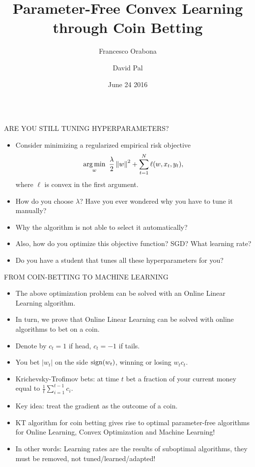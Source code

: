 \documentclass[final,t,serif,mathserif]{beamer}
\title{\huge Parameter-Free Convex Learning through Coin Betting}
\author{Francesco Orabona \and David Pal}
\institute[] %
{
  Yahoo Research, New York
}
\date[June 24 2016]{June 24 2016}
\def\spazio{\vspace{-0.325cm}}
\begin{document}
\begin{frame}{} 

\begin{columns}[t]
  \begin{column}{.33\linewidth}

    \begin{block}{ARE YOU STILL TUNING HYPERPARAMETERS?}
      \spazio
      \centering
      \begin{itemize}
      \item Consider minimizing a regularized empirical risk objective
      \begin{equation}
      \label{equation:objective-function}
         \operatorname*{arg\,min}_{w} \ \frac{\lambda}{2} \left\|{w}\right\|^2 + \sum_{t=1}^N \ell(w, x_t, y_t),
      \end{equation}
      where $\ell$ is convex in the first argument.
      \item How do you choose $\lambda$? Have you ever wondered why you have to tune it manually?
      \item Why the algorithm is not able to select it automatically?
      \item Also, how do you optimize this objective function? SGD? What learning rate?
      \item Do you have a student that tunes all these hyperparameters for you?
      \end{itemize}
      \spazio
    \end{block}
    

    \begin{block}{FROM COIN-BETTING TO MACHINE LEARNING}
    \spazio
    \begin{itemize}
      \item The above optimization problem can be solved with an Online Linear Learning algorithm.
      \item In turn, we prove that Online Linear Learning can be solved with online algorithms to bet on a coin.
      \item Denote by $c_t=1$ if head, $c_t=-1$ if tails.
      \item You bet $|w_t|$ on the side ${\rm sign}(w_t)$, winning or losing $ w_t c_t$.
      \item Krichevsky-Trofimov bets: at time $t$ bet a fraction of your current money equal to $\tfrac{1}{t} \sum_{i=1}^{t-1} c_i$.
      \item Key idea: treat the gradient as the outcome of a coin.
      \item \alert{KT algorithm for coin betting gives rise to optimal parameter-free algorithms for Online Learning, Convex Optimization and Machine Learning!}
      \item In other words: \alert{Learning rates are the results of suboptimal algorithms, they must be removed, not tuned/learned/adapted!}
    \end{itemize}
    \spazio
    \end{block}
    

\end{column}
\end{columns}
\end{frame}
\end{document}

